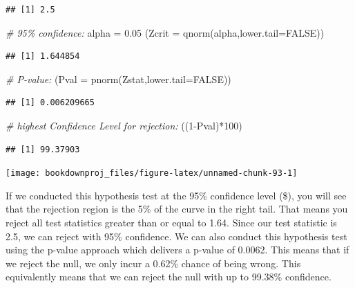 \documentclass[
]{book}
\newenvironment{Shaded}{\begin{snugshade}}{\end{snugshade}}
\newcommand{\AttributeTok}[1]{\textcolor[rgb]{0.77,0.63,0.00}{#1}}
\newcommand{\CommentTok}[1]{\textcolor[rgb]{0.56,0.35,0.01}{\textit{#1}}}
\newcommand{\ConstantTok}[1]{\textcolor[rgb]{0.00,0.00,0.00}{#1}}
\newcommand{\DecValTok}[1]{\textcolor[rgb]{0.00,0.00,0.81}{#1}}
\newcommand{\FloatTok}[1]{\textcolor[rgb]{0.00,0.00,0.81}{#1}}
\newcommand{\FunctionTok}[1]{\textcolor[rgb]{0.00,0.00,0.00}{#1}}
\newcommand{\NormalTok}[1]{#1}
\newcommand{\OtherTok}[1]{\textcolor[rgb]{0.56,0.35,0.01}{#1}}
\newcommand{\SpecialCharTok}[1]{\textcolor[rgb]{0.00,0.00,0.00}{#1}}
\begin{document}
\begin{verbatim}
## [1] 2.5
\end{verbatim}

\begin{Shaded}
\begin{Highlighting}[]
\CommentTok{\# 95\% confidence:}
\NormalTok{alpha }\OtherTok{=} \FloatTok{0.05}
\NormalTok{(}\AttributeTok{Zcrit =} \FunctionTok{qnorm}\NormalTok{(alpha,}\AttributeTok{lower.tail=}\ConstantTok{FALSE}\NormalTok{))}
\end{Highlighting}
\end{Shaded}

\begin{verbatim}
## [1] 1.644854
\end{verbatim}

\begin{Shaded}
\begin{Highlighting}[]
\CommentTok{\# P{-}value:}
\NormalTok{(}\AttributeTok{Pval =} \FunctionTok{pnorm}\NormalTok{(Zstat,}\AttributeTok{lower.tail=}\ConstantTok{FALSE}\NormalTok{))}
\end{Highlighting}
\end{Shaded}

\begin{verbatim}
## [1] 0.006209665
\end{verbatim}

\begin{Shaded}
\begin{Highlighting}[]
\CommentTok{\# highest Confidence Level for rejection:}
\NormalTok{((}\DecValTok{1}\SpecialCharTok{{-}}\NormalTok{Pval)}\SpecialCharTok{*}\DecValTok{100}\NormalTok{)}
\end{Highlighting}
\end{Shaded}

\begin{verbatim}
## [1] 99.37903
\end{verbatim}

\begin{center}\texttt{[image: bookdownproj\_files/figure-latex/unnamed-chunk-93-1]} \end{center}

If we conducted this hypothesis test at the 95\% confidence level (\$), you will see that the rejection region is the 5\% of the curve in the right tail. That means you reject all test statistics greater than or equal to 1.64. Since our test statistic is 2.5, we can reject with 95\% confidence. We can also conduct this hypothesis test using the p-value approach which delivers a p-value of 0.0062. This means that if we reject the null, we only incur a 0.62\% chance of being wrong. This equivalently means that we can reject the null with up to 99.38\% confidence.
\end{document}
